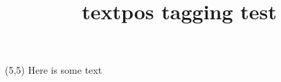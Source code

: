 \documentclass{article}
\title{textpos tagging test}
\begin{document}
\begin{textblock}{2}(5,5)
Here is some text
\end{textblock}
\end{document}
